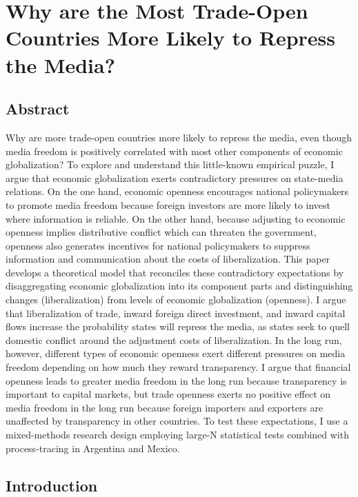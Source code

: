 \documentclass[12pt]{report}
\begin{document}
\chapter{Why are the Most Trade-Open Countries More Likely to Repress
the Media?}

\section{Abstract}

Why are more trade-open countries more likely to repress
the media, even though media freedom is positively correlated with
most other components of economic globalization? To explore and understand
this little-known empirical puzzle, I argue that economic globalization
exerts contradictory pressures on state-media relations. On the one
hand, economic openness encourages national policymakers to promote
media freedom because foreign investors are more likely to invest
where information is reliable. On the other hand, because adjusting
to economic openness implies distributive conflict which can threaten
the government, openness also generates incentives for national policymakers
to suppress information and communication about the costs of liberalization.
This paper develops a theoretical model that reconciles these contradictory
expectations by disaggregating economic globalization into its component
parts and distinguishing changes (liberalization) from levels of economic
globalization (openness). I argue that liberalization of trade, inward
foreign direct investment, and inward capital flows increase the probability
states will repress the media, as states seek to quell domestic conflict
around the adjustment costs of liberalization. In the long run, however,
different types of economic openness exert different pressures on
media freedom depending on how much they reward transparency. I argue
that financial openness leads to greater media freedom in the long
run because transparency is important to capital markets, but trade
openness exerts no positive effect on media freedom in the long run
because foreign importers and exporters are unaffected by transparency
in other countries. To test these expectations, I use a mixed-methods
research design employing large-N statistical tests combined with
process-tracing in Argentina and Mexico.

\section{Introduction}
\end{document}
